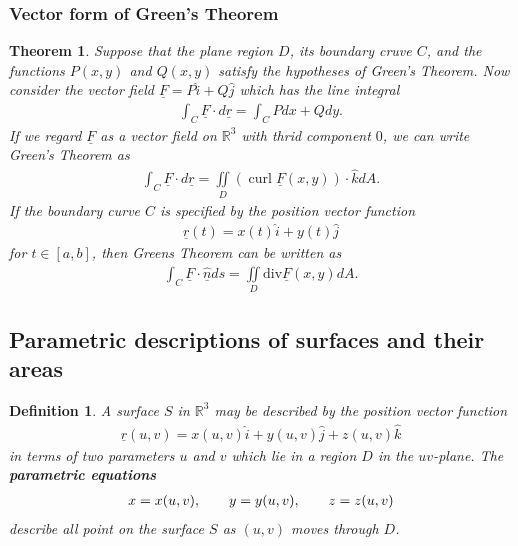 \documentclass{article}
\theoremstyle{sltheorem}
\newtheorem{definition}{Definition}[section]
\newtheorem{theorem}{Theorem}[section]
\newcommand{\R}{\mathbb{R}}
\newcommand{\ih}{\widehat i}
\newcommand{\jh}{\widehat j}
\newcommand{\kh}{\widehat k}
\newcommand{\di}{\iint\limits}
\newcommand{\hs}{\hspace{0.7cm}}
\DeclareMathOperator{\curl}{curl}
\renewcommand{\div}{\text{div}}
\renewcommand{\vec}{\underline}
\newcommand*\B[1]{\textbf{#1}}
\begin{document}
\subsubsection{Vector form of Green's Theorem}
\begin{theorem}
    Suppose that the plane region $D$, its boundary cruve $C$, and the functions
    $P(x,y)$ and $Q(x,y)$ satisfy the hypotheses of \emph{Green's Theorem}. Now
    consider the vector field $\vec F = P\ih + Q\jh$ which has the line integral
    \begin{align*}
        \int_C\vec F \cdot d\vec r = \int_C Pdx + Qdy.
    \end{align*}
    If we regard $\vec F$ as a vector field on $\R^3$ with thrid component $0$, 
    we can write Green's Theorem as
    \begin{align*}
        \int_C\vec F \cdot d\vec r = \di_D\left(\curl\vec F(x,y)\right)\cdot\kh dA.
    \end{align*}
    If the boundary curve $C$ is specified by the position vector function
    \begin{align*}
        \vec r(t) = x(t)\ih + y(t)\jh
    \end{align*}
    for $t\in[a,b]$, then Greens Theorem can be written as
    \begin{align*}
        \int_C \vec F\cdot \vec{\hat n} ds = \di_D \div\vec F(x,y)dA.
    \end{align*}
\end{theorem}
\subsection{Parametric descriptions of surfaces and their areas}
\begin{definition}
    A surface $S$ in $\R^3$ may be described by the position vector function
    \begin{align*}
        \vec r(u,v) = x(u,v)\ih + y(u,v)\jh + z(u,v)\kh
    \end{align*}
    in terms of two parameters $u$ and $v$ which lie in a region $D$ in the $uv$-plane.
    The \B{parametric equations}
    \begin{align*}
        x = x(u,v),\hs y=y(u,v),\hs z=z(u,v)
    \end{align*}
    describe all point on the surface $S$ as $(u,v)$ moves through $D$.
\end{definition}
\end{document}
